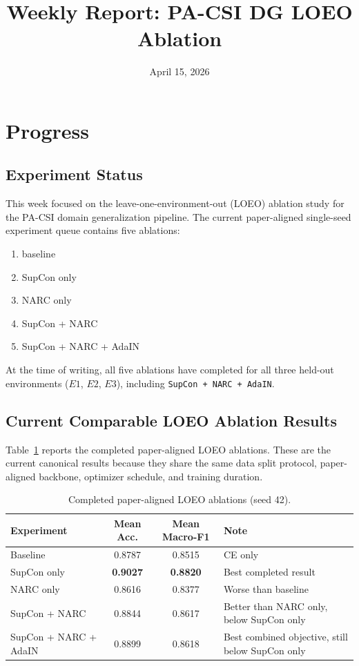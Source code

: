 \documentclass[11pt]{article}
\title{Weekly Report: PA-CSI DG LOEO Ablation}
\author{}
\date{April 15, 2026}
\begin{document}
\maketitle

\section{Progress}

\subsection{Experiment Status}
This week focused on the leave-one-environment-out (LOEO) ablation study for the PA-CSI domain generalization pipeline. The current paper-aligned single-seed experiment queue contains five ablations:
\begin{enumerate}
    \item baseline
    \item SupCon only
    \item NARC only
    \item SupCon + NARC
    \item SupCon + NARC + AdaIN
\end{enumerate}

At the time of writing, all five ablations have completed for all three held-out environments ($E1$, $E2$, $E3$), including \texttt{SupCon + NARC + AdaIN}.

\subsection{Current Comparable LOEO Ablation Results}
Table~\ref{tab:overall} reports the completed paper-aligned LOEO ablations. These are the current canonical results because they share the same data split protocol, paper-aligned backbone, optimizer schedule, and training duration.

\begin{table}[H]
\centering
\caption{Completed paper-aligned LOEO ablations (seed 42).}
\label{tab:overall}
\begin{tabular}{lccp{2.4in}}
\toprule
Experiment & Mean Acc. & Mean Macro-F1 & Note \\
\midrule
Baseline & 0.8787 & 0.8515 & CE only \\
SupCon only & \textbf{0.9027} & \textbf{0.8820} & Best completed result \\
NARC only & 0.8616 & 0.8377 & Worse than baseline \\
SupCon + NARC & 0.8844 & 0.8617 & Better than NARC only, below SupCon only \\
SupCon + NARC + AdaIN & 0.8899 & 0.8618 & Best combined objective, still below SupCon only \\
\bottomrule
\end{tabular}
\end{table}
\end{document}
